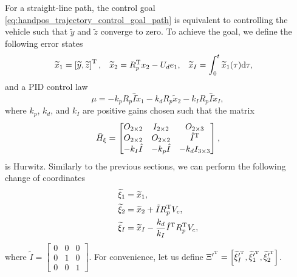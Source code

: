 For a straight-line path, the control goal \eqref{eq:handpos_trajectory_control_goal_path} is equivalent to controlling the vehicle such that $\widetilde{y}$ and $\widetilde{z}$ converge to zero.
To achieve the goal, we define the following error states
    \begin{align}
        \widetilde{x}_1 &= \left[\widetilde{y}, \widetilde{z}\right]^{\mathrm{T}}, &
        \widetilde{x}_2 &= R_p^{\mathrm{T}} x_2 - U_d e_1, &
        \widetilde{x}_I &= \int_{0}^{t} \widetilde{x}_1(\tau) {\rm d}\tau,
    \end{align} 
and a PID control law
\begin{equation}
    \mu = -k_p R_p \hat{I} \widetilde{x}_1 - k_d R_p \widetilde{x}_2 - k_I R_p \hat{I} \widetilde{x}_I,
    \label{eq:handpos_trajectory_straight_line_path_PID}
\end{equation}
where $k_p$, $k_d$, and $k_I$ are positive gains chosen such that the matrix
\begin{equation}
    \Bar{H}_{\xi}
    =
    \begin{bmatrix}
        O_{2 \times 2} & I_{2 \times 2} & O_{2 \times 3} \\
        O_{2 \times 2} & O_{2 \times 2} & \hat{I}^{\mathrm{T}} \\
        -k_I \hat{I} & -k_p \hat{I} & -k_d I_{3 \times 3}
    \end{bmatrix},
    \label{eq:handpos_trajectory_H_xi_prime}
\end{equation}
is Hurwitz.
Similarly to the previous sections, we can perform the following change of coordinates
\begin{subequations}
    \begin{align}
        \widetilde{\xi}_1 &= \widetilde{x}_1, \\
        \widetilde{\xi}_2 &= \widetilde{x}_2 + \tilde{I} R_p^{\mathrm{T}} V_c, \\
        \widetilde{\xi}_I &= \widetilde{x}_I - \frac{k_d}{k_I}\hat{I}^{\mathrm{T}} R_p^{\mathrm{T}} V_c,
    \end{align} \label{eq:handpos_trajectory_error_coordinates_straight_line_path}
\end{subequations}
where $\tilde{I} = \begin{bmatrix} 0 & 0 & 0 \\ 0 & 1 & 0 \\ 0 & 0 & 1 \end{bmatrix}$.
For convenience, let us define $\Xi^{\prime^{\mathrm{T}}} = \left[\widetilde{\xi}_I^{\prime^{\mathrm{T}}}, \widetilde{\xi}_1^{\prime^{\mathrm{T}}}, \widetilde{\xi}_2^{\prime^{\mathrm{T}}}\right]$.
